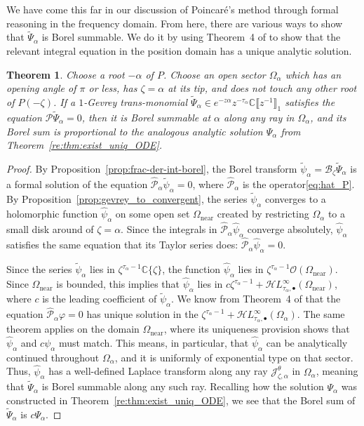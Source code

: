 \documentclass{article}
\newcommand{\singexp}[2]{\mathcal{H}L^\infty_{#1, #2}}
\newcommand{\singexpalg}[1]{\singexp{#1}{\bullet}}
\newcommand{\C}{\mathbb{C}}
\newcommand{\series}[1]{\tilde{#1}}
\newcommand{\borel}{\mathcal{B}}
\theoremstyle{definition}
\theoremstyle{plain}
\newtheorem{theorem}{Theorem}[section]
\begin{document}
We have come this far in our discussion of Poincar\'{e}'s method through formal reasoning in the frequency domain. From here, there are various ways to show that $\series{\Psi}_\alpha$ is Borel summable. We do it by using Theorem~4 of \cite{reg-sing-volterra} to show that the relevant integral equation in the position domain has a unique analytic solution.
\begin{theorem}\label{thm:summability_ODE}
Choose a root $-\alpha$ of $P$. Choose an open sector $\Omega_\alpha$ which has an opening angle of $\pi$ or less, has $\zeta = \alpha$ at its tip, and does not touch any other root of $P(-\zeta)$. If a $1$-Gevrey trans-monomial $\series{\Psi}_\alpha \in e^{-z\alpha} z^{-\tau_\alpha}\C\llbracket z^{-1} \rrbracket_1$ satisfies the equation $\mathcal{P} \series{\Psi}_\alpha = 0$, then it is Borel summable at $\alpha$ along any ray in $\Omega_\alpha$, and its Borel sum is proportional to the analogous analytic solution $\Psi_\alpha$ from Theorem~\ref{re:thm:exist_uniq_ODE}.
\end{theorem}
\begin{proof}
By Proposition~\ref{prop:frac-der-int-borel}, the Borel transform $\series{\psi}_\alpha = \borel_\zeta \series{\Psi}_\alpha$ is a formal solution of the equation $\hat{\mathcal{P}}_\alpha \series{\psi}_\alpha = 0$, where $\hat{\mathcal{P}}_\alpha$ is the operator\eqref{eq:hat_P}. By Proposition~\ref{prop:gevrey_to_convergent}, the series $\series{\psi}_\alpha$ converges to a holomorphic function $\hat{\psi}_\alpha$ on some open set $\Omega_\text{near}$ created by restricting $\Omega_\alpha$ to a small disk around of $\zeta = \alpha$. Since the integrals in $\hat{\mathcal{P}}_\alpha \hat{\psi}_\alpha$ converge absolutely, $\hat{\psi}_\alpha$ satisfies the same equation that its Taylor series does: $\hat{\mathcal{P}}_\alpha \hat{\psi}_\alpha = 0$.

Since the series $\series{\psi}_\alpha$ lies in $\zeta^{\tau_\alpha-1} \C\{\zeta\}$, the function $\hat{\psi}_\alpha$ lies in $\zeta^{\tau_\alpha-1} \mathcal{O}(\Omega_\text{near})$. Since $\Omega_\text{near}$ is bounded, this implies that $\hat{\psi}_\alpha$ lies in $c \zeta^{\tau_\alpha-1} + \singexpalg{\tau_\alpha}(\Omega_\text{near})$, where $c$ is the leading coefficient of $\series{\psi}_\alpha$. We know from Theorem~4 of \cite{reg-sing-volterra} that the equation $\hat{\mathcal{P}}_\alpha \varphi = 0$ has unique solution in the $\zeta^{\tau_\alpha-1} + \singexpalg{\tau_\alpha}(\Omega_\alpha)$. The same theorem applies on the domain $\Omega_\text{near}$, where its uniqueness provision shows that $\hat{\psi}_\alpha$ and $c\psi_\alpha$ must match. This means, in particular, that $\hat{\psi}_\alpha$ can be analytically continued throughout $\Omega_\alpha$, and it is uniformly of exponential type on that sector. Thus, $\hat{\psi}_\alpha$ has a well-defined Laplace transform along any ray $\mathcal{J}^\theta_{\zeta, \alpha}$ in $\Omega_\alpha$, meaning that $\series{\Psi}_\alpha$ is Borel summable along any such ray. Recalling how the solution $\Psi_\alpha$ was constructed in Theorem~\ref{re:thm:exist_uniq_ODE}, we see that the Borel sum of $\series{\Psi}_\alpha$ is $c\Psi_\alpha$.
\end{proof}
\end{document}
